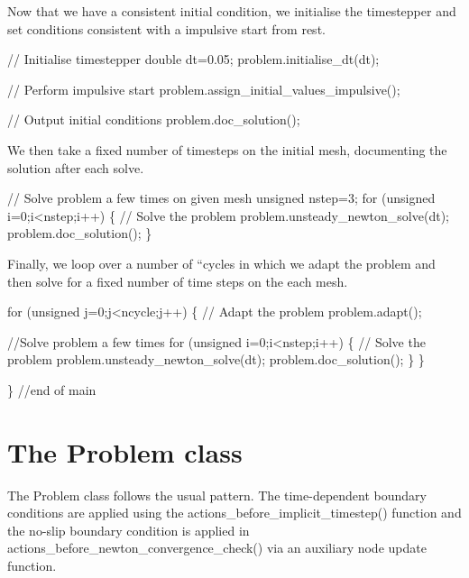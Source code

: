 Now that we have a consistent initial condition, we initialise the timestepper and set conditions consistent with a impulsive start from rest.


\begin{DoxyCodeInclude}
 
 \textcolor{comment}{// Initialise timestepper}
 \textcolor{keywordtype}{double} dt=0.05;
 problem.initialise\_dt(dt);

 \textcolor{comment}{// Perform impulsive start}
 problem.assign\_initial\_values\_impulsive();

 \textcolor{comment}{// Output initial conditions}
 problem.doc\_solution();

\end{DoxyCodeInclude}


We then take a fixed number of timesteps on the initial mesh, documenting the solution after each solve.


\begin{DoxyCodeInclude}

 \textcolor{comment}{// Solve problem a few times on given mesh}
 \textcolor{keywordtype}{unsigned} nstep=3;
 \textcolor{keywordflow}{for} (\textcolor{keywordtype}{unsigned} i=0;i<nstep;i++)
  \{
   \textcolor{comment}{// Solve the problem}
   problem.unsteady\_newton\_solve(dt);    
   problem.doc\_solution();
  \}

\end{DoxyCodeInclude}


Finally, we loop over a number of ``cycles\textquotesingle{}\textquotesingle{} in which we adapt the problem and then solve for a fixed number of time steps on the each mesh.


\begin{DoxyCodeInclude}
 \textcolor{keywordflow}{for} (\textcolor{keywordtype}{unsigned} j=0;j<ncycle;j++)
  \{       
   \textcolor{comment}{// Adapt the problem}
   problem.adapt();

   \textcolor{comment}{//Solve problem a few times}
   \textcolor{keywordflow}{for} (\textcolor{keywordtype}{unsigned} i=0;i<nstep;i++)
    \{     
     \textcolor{comment}{// Solve the problem}
     problem.unsteady\_newton\_solve(dt);
     problem.doc\_solution();
    \}
  \}

\} \textcolor{comment}{//end of main}

\end{DoxyCodeInclude}




 

 \hypertarget{index_problem}{}\section{The Problem class}\label{index_problem}
The Problem class follows the usual pattern. The time-\/dependent boundary conditions are applied using the {\ttfamily actions\+\_\+before\+\_\+implicit\+\_\+timestep()} function and the no-\/slip boundary condition is applied in {\ttfamily actions\+\_\+before\+\_\+newton\+\_\+convergence\+\_\+check()} via an auxiliary node update function.

